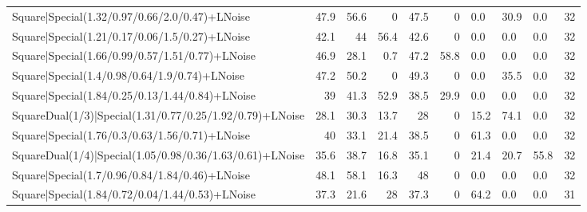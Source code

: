 \begin{tabular}{lrrrrrlllr}
 Square|Special(1.32/0.97/0.66/2.0/0.47)+LNoise                  &            47.9 &            56.6 &             0   &            47.5 &            0   & 0.0             & 30.9           & 0.0            &           32 \\
 Square|Special(1.21/0.17/0.06/1.5/0.27)+LNoise                  &            42.1 &            44   &            56.4 &            42.6 &            0   & 0.0             & 0.0            & 0.0            &           32 \\
 Square|Special(1.66/0.99/0.57/1.51/0.77)+LNoise                 &            46.9 &            28.1 &             0.7 &            47.2 &           58.8 & 0.0             & 0.0            & 0.0            &           32 \\
 Square|Special(1.4/0.98/0.64/1.9/0.74)+LNoise                   &            47.2 &            50.2 &             0   &            49.3 &            0   & 0.0             & 35.5           & 0.0            &           32 \\
 Square|Special(1.84/0.25/0.13/1.44/0.84)+LNoise                 &            39   &            41.3 &            52.9 &            38.5 &           29.9 & 0.0             & 0.0            & 0.0            &           32 \\
 SquareDual(1/3)|Special(1.31/0.77/0.25/1.92/0.79)+LNoise        &            28.1 &            30.3 &            13.7 &            28   &            0   & 15.2            & 74.1           & 0.0            &           32 \\
 Square|Special(1.76/0.3/0.63/1.56/0.71)+LNoise                  &            40   &            33.1 &            21.4 &            38.5 &            0   & 61.3            & 0.0            & 0.0            &           32 \\
 SquareDual(1/4)|Special(1.05/0.98/0.36/1.63/0.61)+LNoise        &            35.6 &            38.7 &            16.8 &            35.1 &            0   & 21.4            & 20.7           & 55.8           &           32 \\
 Square|Special(1.7/0.96/0.84/1.84/0.46)+LNoise                  &            48.1 &            58.1 &            16.3 &            48   &            0   & 0.0             & 0.0            & 0.0            &           32 \\
 Square|Special(1.84/0.72/0.04/1.44/0.53)+LNoise                 &            37.3 &            21.6 &            28   &            37.3 &            0   & 64.2            & 0.0            & 0.0            &           31 \\

\end{tabular}
